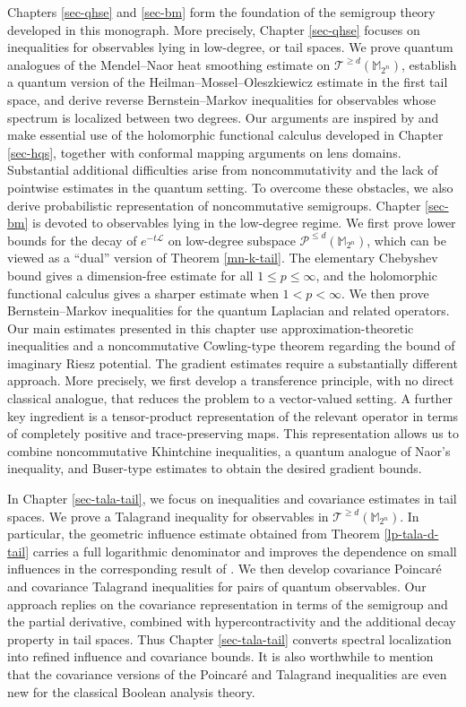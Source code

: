 \documentclass{amsbook}
\theoremstyle{definition}
\theoremstyle{remark}
\numberwithin{section}{chapter}
\numberwithin{equation}{chapter}
\newcommand{\1}{\mathbf{1}}
\begin{document}
Chapters \ref{sec-qhse} and \ref{sec-bm} form the foundation of the semigroup theory developed in this monograph.  More precisely, Chapter \ref{sec-qhse} focuses on inequalities for observables lying in low-degree, or tail spaces. We prove quantum analogues of the Mendel--Naor heat smoothing estimate on $\mathcal{T}^{\geq d}(\mathbb{M}_{2^n})$, establish a quantum version of the Heilman--Mossel--Oleszkiewicz estimate in the first tail space, and derive reverse Bernstein--Markov inequalities for observables whose spectrum is localized between two degrees. Our arguments are inspired by \cite{MN2014,EI2020,HMO2017} and make essential use of the holomorphic functional calculus developed  in Chapter \ref{sec-hqs}, together with conformal mapping arguments on lens domains. Substantial additional difficulties arise from noncommutativity and the lack of pointwise estimates in the quantum setting. To overcome these obstacles, we also derive probabilistic representation of noncommutative semigroups. Chapter \ref{sec-bm} is devoted to observables lying in the low-degree regime.  We first prove lower bounds for the decay of $e^{-t\mathcal L}$ on low-degree subspace $\mathcal P^{\leq d}(\mathbb{M}_{2^{n}})$, which can be viewed as a ``dual'' version of Theorem \ref{mn-k-tail}.  The elementary Chebyshev bound gives a dimension-free estimate for all $1\leq p\leq \infty$, and the holomorphic functional calculus gives a sharper estimate when $1<p<\infty$.  We then prove Bernstein--Markov inequalities for the quantum Laplacian and related operators.  Our main estimates presented in this chapter use approximation-theoretic inequalities and a noncommutative Cowling-type theorem regarding the bound of imaginary Riesz potential.  The gradient estimates require a substantially different approach. More precisely, we first develop a transference principle, with no direct classical analogue, that reduces the problem to a vector-valued setting. A further key ingredient is a tensor-product representation of the relevant operator in terms of completely positive and trace-preserving maps. This representation allows us to combine noncommutative Khintchine inequalities, a quantum analogue of Naor's inequality, and Buser-type estimates to obtain the desired gradient bounds.

In Chapter \ref{sec-tala-tail}, we  focus on inequalities and covariance estimates in tail spaces.  We prove a Talagrand inequality for observables in $\mathcal{T}^{\geq d}(\mathbb{M}_{2^n})$. In particular, the geometric influence estimate obtained from Theorem \ref{lp-tala-d-tail} carries a full logarithmic denominator and improves the dependence on small influences in the corresponding result of \cite{RWZ2024}. We then develop covariance Poincar\'e and covariance Talagrand inequalities for pairs of quantum observables. Our approach replies on the covariance representation in terms of the semigroup and the partial derivative, combined with hypercontractivity and the additional decay property in tail spaces. Thus Chapter \ref{sec-tala-tail} converts spectral localization into refined influence and covariance bounds. 
It is also worthwhile to mention that the covariance versions of the Poincar\'e and Talagrand inequalities are even new for the classical Boolean analysis theory.
\end{document}
